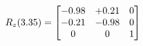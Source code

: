 \documentclass[preview]{standalone}
\begin{document}
\begin{align*}
\special{dvisvgm:raw <g id='unique000'>}R_{z}(3.35) = \begin{bmatrix}-0.98 & +0.21 & 0 \\-0.21 & -0.98 & 0 \\0 & 0 & 1\end{bmatrix}\special{dvisvgm:raw </g>}
\end{align*}
\end{document}
